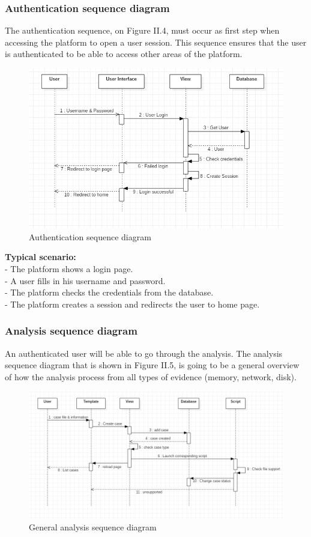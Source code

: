 \subsubsection{Authentication sequence diagram}
The authentication sequence, on Figure II.4, must occur as first step when accessing the platform to open a user session. This sequence ensures that the user is authenticated to be able to access other areas of the platform.
\begin{figure}[H]
\centering
\includegraphics[width=1\columnwidth]{Figures/sequence.png}
\caption{Authentication sequence diagram}
\end{figure}
\textbf{Typical scenario:}\\
- The platform shows a login page.\\
- A user fills in his username and password.\\
- The platform checks the credentials from the database.\\
- The platform creates a session and redirects the user to home page.\\

\subsubsection{Analysis sequence diagram}
An authenticated user will be able to go through the analysis. The analysis sequence diagram that is shown in Figure II.5, is going to be a general overview of how the analysis process from all types of evidence (memory, network, disk).
\begin{figure}[H]
\centering
\includegraphics[width=1\columnwidth]{Figures/sequence1.png}
\caption{General analysis sequence diagram}
\end{figure}

